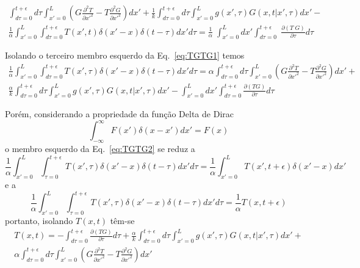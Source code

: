 \begin{equation}\label{eq:TGTG1}
    \begin{split}
	\int_{d\tau=0}^{t+\epsilon} d\tau
        \int_{x'=0}^{L} \left(G \frac{\partial^2 T}{\partial x'^2} 
      - T \frac{\partial ^2G} {\partial x'^2} \right)dx' + 
	\frac{1}{k} \int_{d\tau=0}^{t+\epsilon} d\tau \int_{x'=0}^{L} g(x',\tau) G(x,t|x',\tau) dx' - \\
        \frac{1}{\alpha}\int_{x'=0}^{L} \int_{d\tau=0}^{t+\epsilon}T(x',t) \delta(x'-x)\delta(t-\tau) dx' d\tau = 
        \frac{1}{\alpha} \; \int_{x'=0}^{L} dx' \int_{d\tau=0}^{t+\epsilon} \; \frac{ \partial (T \; G)} {\partial \tau} d\tau
    \end{split}
\end{equation}
	
Isolando o terceiro membro esquerdo da Eq.~\ref{eq:TGTG1} temos 
\begin{equation}\label{eq:TGTG2}
    \begin{split}
        \frac{1}{\alpha}\int_{x'=0}^{L} 
        \int_{d\tau=0}^{t+\epsilon}T(x',\tau) \delta(x'-x)\delta(t-\tau) dx' d\tau = 
        \alpha \int_{d\tau=0}^{t+\epsilon} d\tau 
        \int_{x'=0}^{L} \left(G\frac{\partial^2T}{\partial x'^2} - 
        T \frac{\partial^2 G}{\partial x'^2}\right)dx' + \\
        \frac{\alpha}{k} \int_{d\tau=0}^{t+\epsilon} d\tau
        \int_{x'=0}^{L}g(x',\tau)G(x,t|x',\tau) dx' - 
        \int_{x'=0}^{L} dx' 
        \int_{d\tau=0}^{t+\epsilon} \frac{\partial(TG)}{\partial\tau} d\tau 
    \end{split}
\end{equation}

Porém, considerando a propriedade da função Delta de Dirac
\begin{equation}\label{eq:dirac}
    \int_{-\infty}^{\infty} F(x') \delta(x-x') dx' = F(x)
\end{equation}	
o membro esquerdo da Eq.~\ref{eq:TGTG2} se reduz a 
\begin{equation}\label{eq:TGTG3}
    \frac{1}{\alpha}\int_{x'=0}^{L} 
    \int_{\tau=0}^{t+\epsilon}T(x',\tau) \delta(x'-x)\delta(t-\tau) dx' d\tau = 	\frac{1}{\alpha}\int_{x'=0}^{L} T(x',t+\epsilon) \delta(x'-x)dx' 
\end{equation}
e a 
\begin{equation}\label{eq:TGTG4}
    \frac{1}{\alpha}\int_{x'=0}^{L} 
    \int_{\tau=0}^{t+\epsilon}T(x',\tau) \delta(x'-x)\delta(t-\tau) dx' d\tau = 	\frac{1}{\alpha} T(x,t+\epsilon) 
\end{equation}
portanto, isolando $T(x,t)$ têm-se
\begin{equation}\label{eq:TGTG5}
    \begin{split}
        T(x,t)= -\int_{d\tau=0}^{t+\epsilon} \frac{\partial (TG)}{\partial\tau} d\tau +
        \frac{\alpha}{k} 
        \int_{d\tau=0}^{t+\epsilon} d\tau 
        \int_{x'=0}^{L}g(x',\tau)G(x,t|x',\tau) dx' + \\ 
	\alpha \int_{d\tau=0}^{t+\epsilon} d\tau
        \int_{x'=0}^{L} \left(G\frac{\partial ^2T}{\partial x'^2} - T \frac{\partial^2 G}{\partial x'^2}\right)dx'
    \end{split}
\end{equation}

